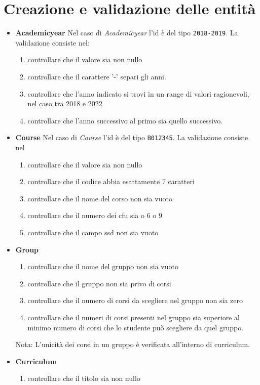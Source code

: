 \documentclass{article}
\begin{document}
\section{Creazione e validazione delle entità}
\begin{itemize}
\item \textbf{Academicyear}
Nel caso di \emph{ Academicyear} l'id è del tipo \texttt{2018-2019}.  La validazione consiste nel:
\begin{enumerate}
\item controllare che il valore sia non nullo
\item controllare che  il carattere '-' separi gli anni.
\item controllare che l'anno indicato si trovi in un range di valori ragionevoli, nel caso tra  2018 e 2022
\item controllare che l'anno successivo al primo sia quello successivo.
\end{enumerate}
\item \textbf{Course}
Nel caso di \emph{Course} l'id è del tipo \texttt{B012345}. La validazione consiste nel
\begin{enumerate}
\item controllare che il valore sia non nullo
\item controllare che il codice abbia esattamente 7 caratteri
\item controllare che il nome del corso non sia vuoto
\item controllare che il numero dei cfu sia o 6 o 9
\item controllare che il campo ssd non sia vuoto
\end{enumerate}
\item \textbf{Group}
\begin{enumerate}
\item controllare che il nome del gruppo non sia vuoto
\item controllare che il gruppo non sia privo di corsi
\item controllare che il numero di corsi da scegliere nel gruppo non sia zero
\item controllare che il numeri di corsi presenti nel gruppo sia superiore al minimo numero di corsi che lo studente può scegliere da quel gruppo.
\end{enumerate}
Nota: L'unicità dei corsi in un gruppo è verificata all'interno di curriculum.
\item \textbf{Curriculum}
\begin{enumerate}
\item controllare che il titolo sia non nullo

\end{enumerate}
\end{itemize}
\end{document}
